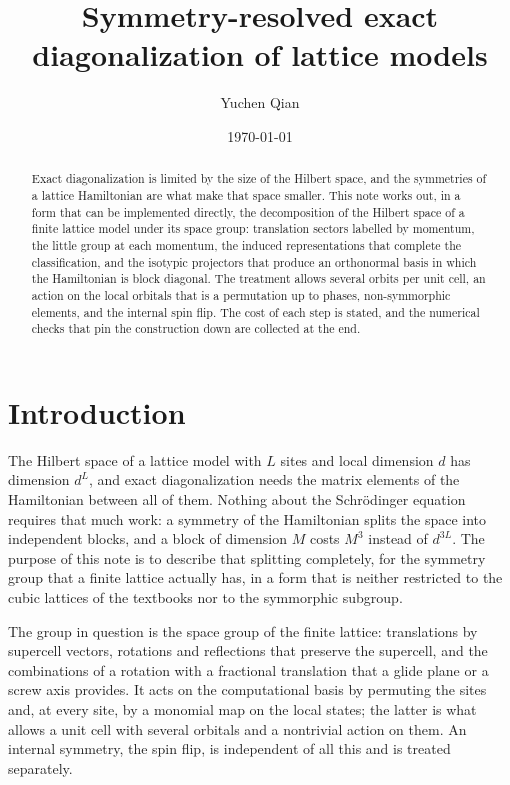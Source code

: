 \documentclass[12pt]{article}
\author{Yuchen Qian}
\date{\today}
\title{Symmetry-resolved exact diagonalization of lattice models}
\begin{document}
\maketitle

\begin{abstract}
Exact diagonalization is limited by the size of the Hilbert space, and the
symmetries of a lattice Hamiltonian are what make that space smaller. This note
works out, in a form that can be implemented directly, the decomposition of the
Hilbert space of a finite lattice model under its space group: translation
sectors labelled by momentum, the little group at each momentum, the induced
representations that complete the classification, and the isotypic projectors
that produce an orthonormal basis in which the Hamiltonian is block diagonal.
The treatment allows several orbits per unit cell, an action on the local
orbitals that is a permutation up to phases, non-symmorphic elements, and the
internal spin flip. The cost of each step is stated, and the numerical checks
that pin the construction down are collected at the end.
\end{abstract}

\tableofcontents

\section{Introduction}

The Hilbert space of a lattice model with $L$ sites and local dimension $d$ has
dimension $d^L$, and exact diagonalization needs the matrix elements of the
Hamiltonian between all of them. Nothing about the Schr\"odinger equation
requires that much work: a symmetry of the Hamiltonian splits the space into
independent blocks, and a block of dimension $M$ costs $M^3$ instead of $d^{3L}$.
The purpose of this note is to describe that splitting completely, for the
symmetry group that a finite lattice actually has, in a form that is neither
restricted to the cubic lattices of the textbooks nor to the symmorphic
subgroup.

The group in question is the space group of the finite lattice: translations by
supercell vectors, rotations and reflections that preserve the supercell, and
the combinations of a rotation with a fractional translation that a glide plane
or a screw axis provides. It acts on the computational basis by permuting the
sites and, at every site, by a monomial map on the local states; the latter is
what allows a unit cell with several orbitals and a nontrivial action on them.
An internal symmetry, the spin flip, is independent of all this and is treated
separately.
\end{document}
